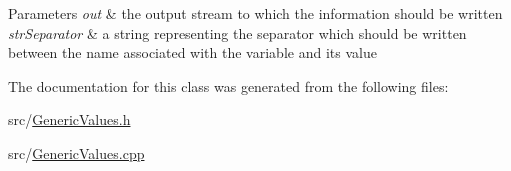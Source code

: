 \begin{DoxyParams}{Parameters}
{\em out} & the output stream to which the information should be written\\
\hline
{\em str\+Separator} & a string representing the separator which should be written between the name associated with the variable and its value \\
\hline
\end{DoxyParams}


The documentation for this class was generated from the following files\+:\begin{DoxyCompactItemize}
\item 
src/\hyperlink{GenericValues_8h}{Generic\+Values.\+h}\item 
src/\hyperlink{GenericValues_8cpp}{Generic\+Values.\+cpp}\end{DoxyCompactItemize}

